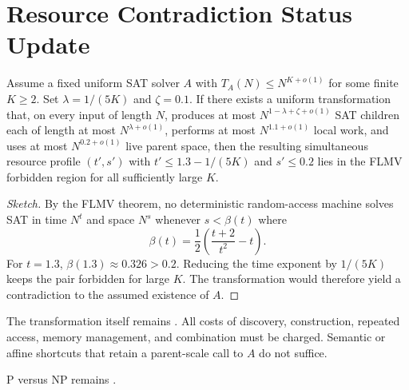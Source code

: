 
\section{Resource Contradiction Status Update}

\begin{theorem}
Assume a fixed uniform SAT solver \(A\) with \(T_A(N) \le N^{K+o(1)}\) for some finite \(K \ge 2\). Set \(\lambda = 1/(5K)\) and \(\zeta = 0.1\). If there exists a uniform transformation that, on every input of length \(N\), produces at most \(N^{1-\lambda+\zeta+o(1)}\) SAT children each of length at most \(N^{\lambda+o(1)}\), performs at most \(N^{1.1+o(1)}\) local work, and uses at most \(N^{0.2+o(1)}\) live parent space, then the resulting simultaneous resource profile \((t', s')\) with \(t' \le 1.3 - 1/(5K)\) and \(s' \le 0.2\) lies in the FLMV forbidden region for all sufficiently large \(K\).
\end{theorem}

\begin{proof}[Sketch]
By the FLMV theorem, no deterministic random-access machine solves SAT in time \(N^t\) and space \(N^s\) whenever \(s < \beta(t)\) where
\[
\beta(t) = \frac{1}{2}\left(\frac{t+2}{t^2} - t\right).
\]
For \(t = 1.3\), \(\beta(1.3) \approx 0.326 > 0.2\). Reducing the time exponent by \(1/(5K)\) keeps the pair forbidden for large \(K\). The transformation would therefore yield a contradiction to the assumed existence of \(A\).
\end{proof}

\begin{remark}
The transformation itself remains \OPEN. All costs of discovery, construction, repeated access, memory management, and combination must be charged. Semantic or affine shortcuts that retain a parent-scale call to \(A\) do not suffice.
\end{remark}

P versus NP remains \OPEN.
